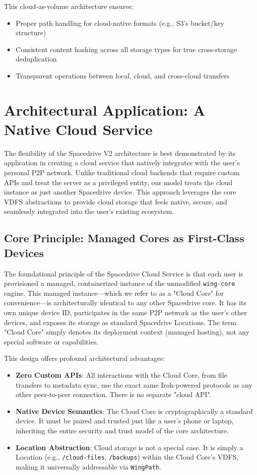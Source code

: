 \documentclass[sigconf]{acmart}
\begin{document}
This cloud-as-volume architecture ensures:
\begin{itemize}[noitemsep, topsep=0pt]
    \item Proper path handling for cloud-native formats (e.g., S3's bucket/key structure)
    \item Consistent content hashing across all storage types for true cross-storage deduplication
    \item Transparent operations between local, cloud, and cross-cloud transfers
\end{itemize}


\section{Architectural Application: A Native Cloud Service}
\label{sec:native-cloud-service}
The flexibility of the Spacedrive V2 architecture is best demonstrated by its application in creating a cloud service that natively integrates with the user's personal P2P network. Unlike traditional cloud backends that require custom APIs and treat the server as a privileged entity, our model treats the cloud instance as just another Spacedrive device. This approach leverages the core VDFS abstractions to provide cloud storage that feels native, secure, and seamlessly integrated into the user's existing ecosystem.

\subsection{Core Principle: Managed Cores as First-Class Devices}
The foundational principle of the Spacedrive Cloud Service is that each user is provisioned a managed, containerized instance of the unmodified \texttt{wing-core} engine. This managed instance—which we refer to as a "Cloud Core" for convenience—is architecturally identical to any other Spacedrive core. It has its own unique device ID, participates in the same P2P network as the user's other devices, and exposes its storage as standard Spacedrive Locations. The term "Cloud Core" simply denotes its deployment context (managed hosting), not any special software or capabilities.

This design offers profound architectural advantages:
\begin{itemize}[noitemsep, topsep=0pt]
    \item \textbf{Zero Custom APIs}: All interactions with the Cloud Core, from file transfers to metadata sync, use the exact same Iroh-powered protocols as any other peer-to-peer connection. There is no separate "cloud API".
    \item \textbf{Native Device Semantics}: The Cloud Core is cryptographically a standard device. It must be paired and trusted just like a user's phone or laptop, inheriting the entire security and trust model of the core architecture.
    \item \textbf{Location Abstraction}: Cloud storage is not a special case. It is simply a Location (e.g., \texttt{/cloud-files}, \texttt{/backups}) within the Cloud Core's VDFS, making it universally addressable via \texttt{WingPath}.
\end{itemize}
\end{document}
